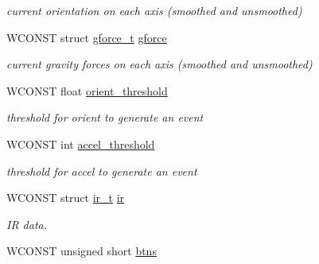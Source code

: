 \begin{DoxyCompactItemize}
\begin{DoxyCompactList}\small\item\em current orientation on each axis (smoothed and unsmoothed) \end{DoxyCompactList}\item 
\hypertarget{structwiimote__t_ab2ccaf1bd030bfb24aa60c474b34d1f4}{W\-C\-O\-N\-S\-T struct \hyperlink{structgforce__t}{gforce\-\_\-t} \hyperlink{structwiimote__t_ab2ccaf1bd030bfb24aa60c474b34d1f4}{gforce}}\label{structwiimote__t_ab2ccaf1bd030bfb24aa60c474b34d1f4}

\begin{DoxyCompactList}\small\item\em current gravity forces on each axis (smoothed and unsmoothed) \end{DoxyCompactList}\item 
\hypertarget{structwiimote__t_ab8e07b8b47e89082b89396d10100db9a}{W\-C\-O\-N\-S\-T float \hyperlink{structwiimote__t_ab8e07b8b47e89082b89396d10100db9a}{orient\-\_\-threshold}}\label{structwiimote__t_ab8e07b8b47e89082b89396d10100db9a}

\begin{DoxyCompactList}\small\item\em threshold for orient to generate an event \end{DoxyCompactList}\item 
\hypertarget{structwiimote__t_a078b9e0aeeacfdabad482db1214d0a88}{W\-C\-O\-N\-S\-T int \hyperlink{structwiimote__t_a078b9e0aeeacfdabad482db1214d0a88}{accel\-\_\-threshold}}\label{structwiimote__t_a078b9e0aeeacfdabad482db1214d0a88}

\begin{DoxyCompactList}\small\item\em threshold for accel to generate an event \end{DoxyCompactList}\item 
\hypertarget{structwiimote__t_a1435415306dac952f29a70d4c3ff206c}{W\-C\-O\-N\-S\-T struct \hyperlink{structir__t}{ir\-\_\-t} \hyperlink{structwiimote__t_a1435415306dac952f29a70d4c3ff206c}{ir}}\label{structwiimote__t_a1435415306dac952f29a70d4c3ff206c}

\begin{DoxyCompactList}\small\item\em I\-R data. \end{DoxyCompactList}\item 
\hypertarget{structwiimote__t_a2e9cbb4da318589efc65ceadc62aca6c}{W\-C\-O\-N\-S\-T unsigned short \hyperlink{structwiimote__t_a2e9cbb4da318589efc65ceadc62aca6c}{btns}}\label{structwiimote__t_a2e9cbb4da318589efc65ceadc62aca6c}


\end{DoxyCompactItemize}
